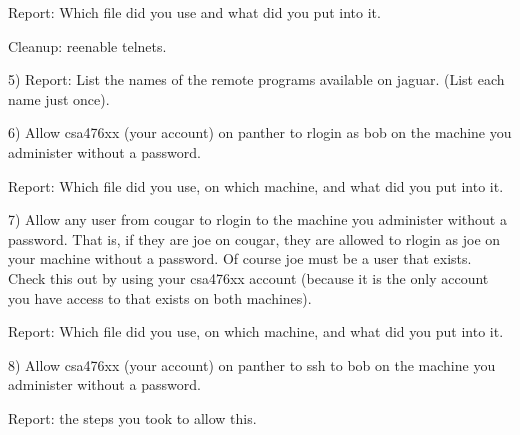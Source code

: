 Report: Which file did you use and what did you put into it.

Cleanup: reenable telnets.

5) Report: List the names of the remote programs available on {\ltt{}jaguar}.
(List each name just once).

6) Allow csa476xx (your account) on {\ltt{}panther} to rlogin as bob 
on the machine you administer without a password.

Report: Which file did you use, on which machine, and what did you put into it.

7) Allow any user from {\ltt{}cougar} to rlogin to the machine you administer 
without a password.
That is, if they are joe on {\ltt{}cougar}, they are allowed to rlogin as
joe on your
machine without a password. Of course joe must be  a user that exists.
Check this out by using your csa476xx account (because it is the only
account you have access to that exists on both machines).

Report: Which file did you use, on which machine, and what did you put into it.

8) Allow csa476xx (your account) on {\ltt{}panther} to ssh to bob 
on the machine you administer without a password.

Report: the steps you took to allow this.

\bye
